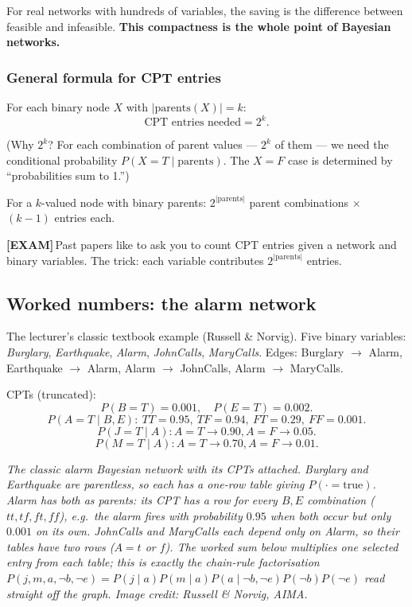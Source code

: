 \documentclass[11pt, a4paper]{article}
\newcommand{\examflag}{\textcolor{tipBd}{\textbf{[EXAM]}}\,}
\begin{document}
For real networks with hundreds of variables, the saving is the difference between feasible and infeasible. \textbf{This compactness is the whole point of Bayesian networks.}

\subsubsection*{General formula for CPT entries}

For each binary node $X$ with $|\mathrm{parents}(X)| = k$:
\[
\text{CPT entries needed} = 2^k.
\]

(Why $2^k$? For each combination of parent values — $2^k$ of them — we need the conditional probability $P(X = T \mid \text{parents})$. The $X = F$ case is determined by ``probabilities sum to 1.'')

For a $k$-valued node with binary parents: $2^{|\mathrm{parents}|}$ parent combinations $\times$ $(k - 1)$ entries each.

\examflag{}Past papers like to ask you to count CPT entries given a network and binary variables. The trick: each variable contributes $2^{|\mathrm{parents}|}$ entries.

\subsection{Worked numbers: the alarm network}

The lecturer's classic textbook example (Russell \& Norvig). Five binary variables: \emph{Burglary}, \emph{Earthquake}, \emph{Alarm}, \emph{JohnCalls}, \emph{MaryCalls}. Edges: Burglary $\to$ Alarm, Earthquake $\to$ Alarm, Alarm $\to$ JohnCalls, Alarm $\to$ MaryCalls.

CPTs (truncated):
\[
P(B = T) = 0.001, \quad P(E = T) = 0.002.
\]
\[
P(A = T \mid B, E):\ TT = 0.95,\ TF = 0.94,\ FT = 0.29,\ FF = 0.001.
\]
\[
P(J = T \mid A): A = T \to 0.90, A = F \to 0.05.
\]
\[
P(M = T \mid A): A = T \to 0.70, A = F \to 0.01.
\]

\begin{center}

\footnotesize\textit{The classic alarm Bayesian network with its CPTs attached. \emph{Burglary} and \emph{Earthquake} are parentless, so each has a one-row table giving $P(\cdot = \text{true})$. \emph{Alarm} has both as parents: its CPT has a row for every $B,E$ combination ($tt, tf, ft, ff$), e.g.\ the alarm fires with probability $0.95$ when both occur but only $0.001$ on its own. \emph{JohnCalls} and \emph{MaryCalls} each depend only on \emph{Alarm}, so their tables have two rows ($A = t$ or $f$). The worked sum below multiplies one selected entry from each table; this is exactly the chain-rule factorisation $P(j,m,a,\neg b,\neg e) = P(j \mid a)P(m \mid a)P(a \mid \neg b, \neg e)P(\neg b)P(\neg e)$ read straight off the graph. Image credit: Russell \& Norvig, AIMA.}
\end{center}
\end{document}
